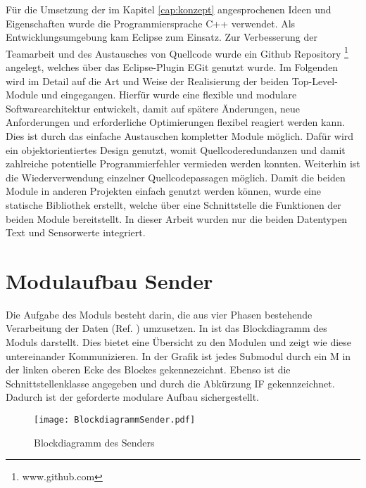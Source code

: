 \label{cap:implementierung}
F{\"u}r die Umsetzung der im Kapitel \ref{cap:konzept} angesprochenen Ideen und
Eigenschaften wurde die Programmiersprache C++ verwendet. Als
Entwicklungsumgebung kam Eclipse zum Einsatz. Zur Verbesserung der Teamarbeit
und des Austausches von Quellcode wurde ein Github Repository
\footnote{www.github.com} angelegt, welches {\"u}ber das Eclipse-Plugin EGit genutzt wurde. \newline Im Folgenden wird
im Detail auf die Art und Weise der Realisierung der beiden Top-Level-Module
 und  eingegangen. Hierf{\"u}r wurde eine flexible und
modulare Softwarearchitektur entwickelt, damit auf sp{\"a}tere {\"A}nderungen, neue Anforderungen
und erforderliche Optimierungen flexibel reagiert werden kann. Dies ist durch
das einfache Austauschen kompletter Module m{\"o}glich.
Daf{\"u}r wird ein objektorientiertes Design genutzt, womit Quellcoderedundanzen und damit
zahlreiche potentielle Programmierfehler vermieden werden konnten.
Weiterhin ist die Wiederverwendung einzelner Quellcodepassagen m{\"o}glich.\newline
Damit die beiden Module in anderen Projekten einfach genutzt werden k{\"o}nnen,
wurde eine statische Bibliothek erstellt, welche {\"u}ber eine Schnittstelle die
Funktionen der beiden Module bereitstellt. In dieser Arbeit wurden nur die beiden
Datentypen Text und Sensorwerte integriert.

\section{Modulaufbau Sender}
 
Die Aufgabe des Moduls  besteht darin, die aus vier Phasen
bestehende Verarbeitung der Daten (Ref. \cite{Daher}) umzusetzen.
In  ist das Blockdiagramm des Moduls 
darstellt.
Dies bietet eine {\"U}bersicht zu den Modulen und zeigt wie diese untereinander 
Kommunizieren. In der Grafik ist jedes Submodul durch ein M in der linken
oberen Ecke des Blockes gekennezeichnt. Ebenso ist die Schnittstellenklasse angegeben
und durch die Abk{\"u}rzung \gls{IF} gekennzeichnet. Dadurch ist der
geforderte modulare Aufbau sichergestellt.

\begin{figure}[H]
\centering
\texttt{[image: BlockdiagrammSender.pdf]} %
\caption{Blockdiagramm des Senders}
\label{fig:BlockdiagrammSender}
\end{figure}


